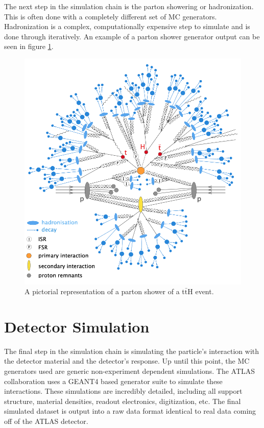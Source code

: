 	The next step in the simulation chain is the parton showering or hadronization. This is often done with a completely different set of MC generators. Hadronization is a complex, computationally expensive step to simulate and is done through iteratively. An example of a parton shower generator output can be seen in figure \ref{fig:hadronization}.

	\begin{figure}[!ht]
	\centering
	\includegraphics[width=\textwidth,keepaspectratio=true]{chapters/chapter4_simulation/images/tth_hadronization_gen.png}
	\caption{\label{fig:hadronization} A pictorial representation of a parton shower of a t$\bar{\mathrm{t}}$H event. \cite{Wanotayaroj:2242196}}
	\end{figure}	

	\section{Detector Simulation}\label{sec:detector-sim}
	The final step in the simulation chain is simulating the particle's interaction with the detector material and the detector's response. Up until this point, the MC generators used are generic non-experiment dependent simulations. The ATLAS collaboration uses a GEANT4 based generator suite to simulate these interactions. \cite{GEANT4} These simulations are incredibly detailed, including all support structure, material densities, readout electronics, digitization, etc. The final simulated dataset is output into a raw data format identical to real data coming off of the ATLAS detector.
